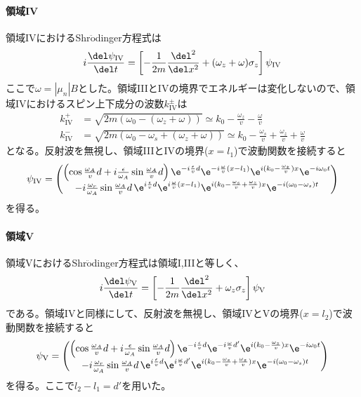 \paragraph{領域IV}
領域IVにおけるShr$\ddot{\mathrm{o}}$dinger方程式は
\begin{equation}
i\frac{\del \psi_\mathrm{IV}}{\del t}= \left[-\frac{1}{2m} \frac{\del^2}{\del x^2} +(\omega_z+\omega) \sigma_z\right] \psi_\mathrm{IV}
\end{equation}
ここで$\omega=|\mu_n|B$とした。領域IIIとIVの境界でエネルギーは変化しないので、領域IVにおけるスピン上下成分の波数$k^\pm_\mathrm{IV}$は
\begin{align}
k^+_\mathrm{IV}&=\sqrt{2m(\omega_0-(\omega_z+\omega))}\simeq k_0 -\frac{\omega_z}{v}-\frac{\omega}{v} \\
k^-_\mathrm{IV}&=\sqrt{2m(\omega_0-\omega_s+(\omega_z+\omega))}\simeq k_0 -\frac{\omega_s}{v}+\frac{\omega_z}{v}+\frac{\omega}{v}
\end{align}
となる。反射波を無視し、領域IIIとIVの境界($x=l_1$)で波動関数を接続すると
\begin{equation}
\psi_\mathrm{IV}=\begin{pmatrix} \left(\cos \frac{\omega_A}{v}d +i\frac{\epsilon}{\omega_A} \sin \frac{\omega_A}{v}d\right) \e^{-i\frac{\epsilon}{v} d} \e^{-i\frac{\omega}{v} (x-l_1)} \e^{i(k_0-\frac{\omega_z}{v})x}\e^{-i\omega_0t} \\ -i \frac{\omega_r}{\omega_A} \sin \frac{\omega_A}{v}d  \, \e^{i\frac{\epsilon}{v}d} \e^{i\frac{\omega}{v}(x-l_1)} \e^{i(k_0-\frac{\omega_s}{v}+\frac{\omega_z}{v})x}\e^{-i(\omega_0-\omega_s)t} \end{pmatrix}
\end{equation}
を得る。

\paragraph{領域V}
領域VにおけるShr$\ddot{\mathrm{o}}$dinger方程式は領域I,IIIと等しく、
\begin{equation}
i\frac{\del \psi_\mathrm{V}}{\del t}= \left[-\frac{1}{2m} \frac{\del^2}{\del x^2} +\omega_z \sigma_z\right] \psi_\mathrm{V}
\end{equation}
である。領域IVと同様にして、反射波を無視し、領域IVとVの境界($x=l_2$)で波動関数を接続すると
\begin{equation}
\psi_\mathrm{V}=\begin{pmatrix} \left(\cos \frac{\omega_A}{v}d +i\frac{\epsilon}{\omega_A} \sin \frac{\omega_A}{v}d\right) \e^{-i\frac{\epsilon}{v} d} \e^{-i\frac{\omega}{v} d'} \e^{i(k_0-\frac{\omega_z}{v})x}\e^{-i\omega_0t} \\ -i \frac{\omega_r}{\omega_A} \sin \frac{\omega_A}{v}d  \, \e^{i\frac{\epsilon}{v}d} \e^{i\frac{\omega}{v} d'} \e^{i(k_0-\frac{\omega_s}{v}+\frac{\omega_z}{v})x}\e^{-i(\omega_0-\omega_s)t} \end{pmatrix} \label{Nonreso_psi5}
\end{equation}
を得る。ここで$l_2-l_1=d'$を用いた。

